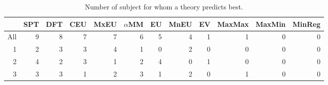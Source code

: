 \begin{table}[!htb]
\centering
\begin{tabular}{rrrrrrrrrrrr}
  \hline
 & SPT & DFT & CEU & MxEU & $\alpha$MM & EU & MnEU & EV & MaxMax & MaxMin & MinReg \\ 
  \hline
All & 9 & 8 & 7 & 7 & 6 & 5 & 4 & 1 & 1 & 0 & 0 \\ 
  1 & 2 & 3 & 3 & 4 & 1 & 0 & 2 & 0 & 0 & 0 & 0 \\ 
  2 & 4 & 2 & 3 & 1 & 2 & 4 & 0 & 1 & 0 & 0 & 0 \\ 
  3 & 3 & 3 & 1 & 2 & 3 & 1 & 2 & 0 & 1 & 0 & 0 \\ 
   \hline
\end{tabular}
\caption{Number of subject for whom a theory predicts best.} 
\label{table2_winners_with_SPT}
\end{table}
